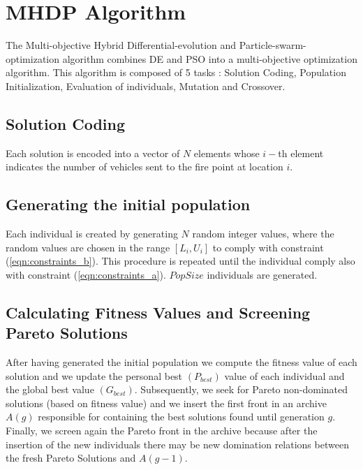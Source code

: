 \section{MHDP Algorithm}
The Multi-objective Hybrid Differential-evolution and Particle-swarm-optimization algorithm combines DE and PSO into a multi-objective optimization algorithm. 
This algorithm is composed of 5 tasks : Solution Coding, Population Initialization, Evaluation of individuals, Mutation and Crossover.
\subsection{Solution Coding}
Each solution is encoded into a vector of $N$ elements whose $i-$th element indicates the number of vehicles sent to the fire point at location $i$.
\subsection{Generating the initial population}
Each individual is created by generating $N$ random integer values, where the random values are chosen in the range \([L_i, U_i]\) to comply with constraint (\ref{eqn:constraints_b}). 
This procedure is repeated until the individual comply also with constraint (\ref{eqn:constraints_a}).
$PopSize$ individuals are generated.
\subsection{Calculating Fitness Values and Screening Pareto Solutions}
After having generated the initial population we compute the fitness value of each solution and we update the personal best \((P_{best})\) value of each individual and the global best value \((G_{best})\).
Subsequently, we seek for Pareto non-dominated solutions (based on fitness value) and we insert the first front in an archive \(A(g)\) responsible for containing the best solutions found until generation \(g\).
Finally, we screen again the Pareto front in the archive because after the insertion of the new individuals there may be new domination relations between the fresh Pareto Solutions and $A(g-1)$.
